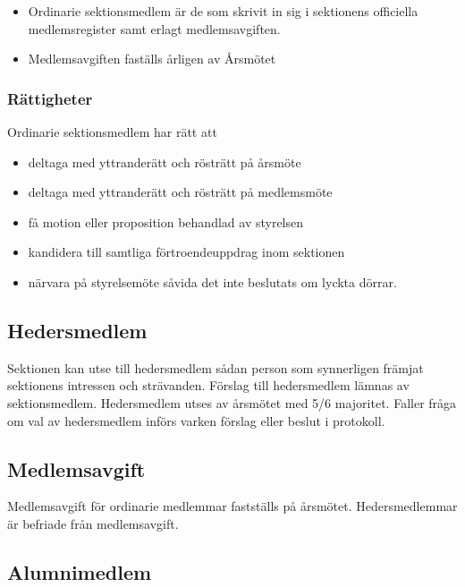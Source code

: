 \documentclass{../resources/dgovdoc}
\begin{document}
\begin{itemize}

  \item Ordinarie sektionsmedlem är de som skrivit in sig i sektionens officiella medlemsregister samt erlagt medlemsavgiften.
  \item Medlemsavgiften faställs årligen av Årsmötet

\end{itemize}

\subsubsection{Rättigheter}

Ordinarie sektionsmedlem har rätt att

\begin{itemize}
  \item deltaga med yttranderätt och rösträtt på årsmöte
  \item deltaga med yttranderätt och rösträtt på medlemsmöte
  \item få motion eller proposition behandlad av styrelsen
  \item kandidera till samtliga förtroendeuppdrag inom sektionen
  \item närvara på styrelsemöte såvida det inte beslutats om lyckta dörrar.
\end{itemize}

\subsection{Hedersmedlem}
\label{sec:hedersmedlem}

Sektionen kan utse till hedersmedlem sådan person som synnerligen främjat
sektionens intressen och strävanden. Förslag till hedersmedlem lämnas av
sektionsmedlem. Hedersmedlem utses av årsmötet med 5/6 majoritet. Faller fråga om val
av hedersmedlem införs varken förslag eller beslut i protokoll.

\subsection{Medlemsavgift}

Medlemsavgift för ordinarie medlemmar fastställs på årsmötet. Hedersmedlemmar är befriade från medlemsavgift.

\subsection{Alumnimedlem}
\label{sec:alumnimedlem}
\end{document}
